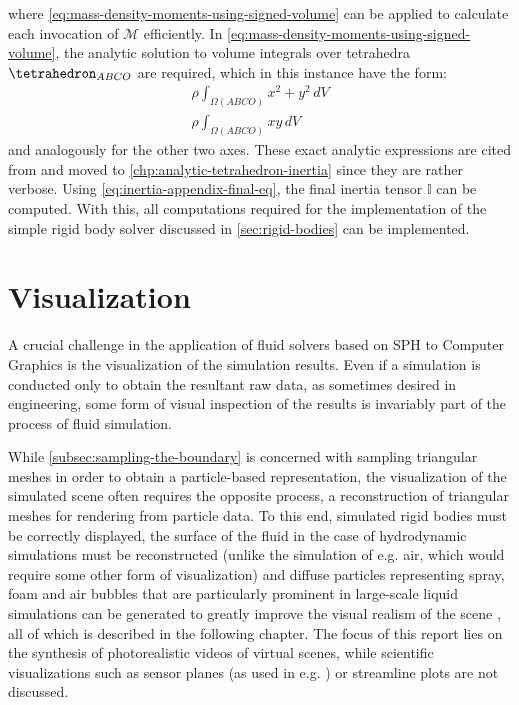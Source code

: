 \documentclass[oneside, a4paper]{book}
\newcommand\br[1]{\left(#1\right)}
\begin{document}
  where \autoref{eq:mass-density-moments-using-signed-volume} can be applied to calculate each invocation of $\mathcal{M}$ efficiently. In \autoref{eq:mass-density-moments-using-signed-volume}, the analytic solution to volume integrals over tetrahedra $\tetrahedron_{ABCO}$ are required, which in this instance have the form:
  \begin{align}
    \rho \int_{\Omega\br{ABCO}} x^2+y^2\, dV\\
    \rho \int_{\Omega\br{ABCO}} xy\, dV
  \end{align}
  and analogously for the other two axes. These exact analytic expressions are cited from \autocite[Tonon]{explicit-exact-tetrahedron-formulas} and moved to \autoref{chp:analytic-tetrahedron-inertia} since they are rather verbose. Using \autoref{eq:inertia-appendix-final-eq}, the final inertia tensor $\mathds{I}$ can be computed. With this, all computations required for the implementation of the simple rigid body solver discussed in \autoref{sec:rigid-bodies} can be implemented.


\chapter{Visualization}\label{chp:visualization}

  A crucial challenge in the application of fluid solvers based on SPH to Computer Graphics is the visualization of the simulation results. Even if a simulation is conducted only to obtain the resultant raw data, as sometimes desired in engineering, some form of visual inspection of the results is invariably part of the process of fluid simulation.
  
  While \autoref{subsec:sampling-the-boundary} is concerned with sampling triangular meshes in order to obtain a particle-based representation, the visualization of the simulated scene often requires the opposite process, a reconstruction of triangular meshes for rendering from particle data. To this end, simulated rigid bodies must be correctly displayed, the surface of the fluid in the case of hydrodynamic simulations must be reconstructed (unlike the simulation of e.g. air, which would require some other form of visualization) and diffuse particles representing spray, foam and air bubbles that are particularly prominent in large-scale liquid simulations can be generated to greatly improve the visual realism of the scene \autocite{unified-spray-foam-bubbles}, all of which is described in the following chapter. The focus of this report lies on the synthesis of photorealistic videos of virtual scenes, while scientific visualizations such as sensor planes (as used in e.g. \autocite[this paper]{compressed-neighbour-lists}) or streamline plots are not discussed.
  
\end{document}
